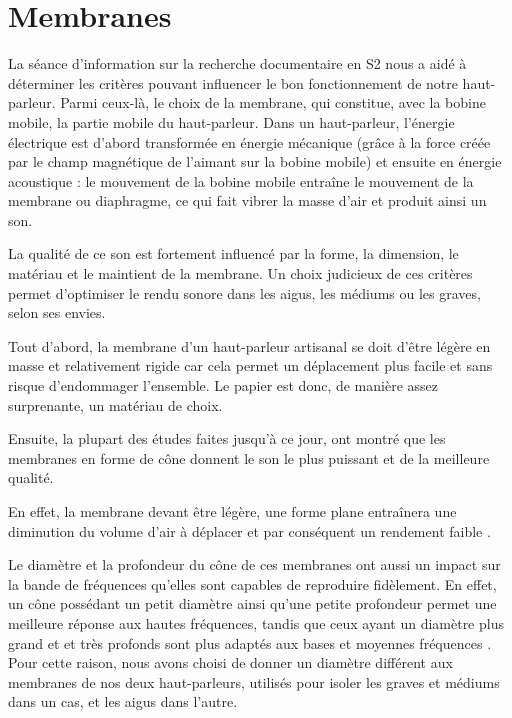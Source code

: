 \section{Membranes}

La séance d’information sur la recherche documentaire en S2
nous a aidé à déterminer les critères pouvant influencer
le bon fonctionnement de notre haut-parleur.
Parmi ceux-là, le choix de la membrane, qui constitue, avec la bobine mobile, la partie mobile
du haut-parleur. Dans un haut-parleur, l'énergie électrique est d'abord transformée en énergie mécanique (grâce à la force créée par le champ magnétique de l'aimant sur la bobine mobile) et ensuite en énergie acoustique : le mouvement de la bobine mobile entraîne le mouvement de la membrane ou diaphragme, ce qui fait vibrer la masse d'air et produit ainsi un son.

La qualité de ce son est fortement influencé par la forme, la dimension, le matériau et le maintient de la membrane.
Un choix judicieux de ces critères permet d'optimiser le rendu sonore dans les aigus, les médiums ou les graves, selon ses envies.

Tout d’abord, la membrane d’un haut-parleur artisanal
se doit d’être légère en masse et relativement rigide
car cela permet un déplacement plus facile et
sans risque d’endommager l’ensemble.
Le papier est donc, de manière assez surprenante, un matériau de choix.

Ensuite, la plupart des études faites jusqu’à ce jour,
ont montré que les membranes en forme de cône
donnent le son le plus puissant et de la meilleure qualité.

En effet, la membrane devant être légère, une forme plane entraînera une diminution du volume d’air à déplacer et par conséquent un rendement faible \cite{f1964compound}.

Le diamètre et la profondeur du cône de ces membranes
ont aussi un impact sur la bande de fréquences
qu’elles sont capables de reproduire fidèlement.
En effet, un cône possédant un petit diamètre ainsi qu'une petite profondeur
permet une meilleure réponse aux hautes fréquences,
tandis que ceux ayant un diamètre plus grand et et très profonds sont plus adaptés aux bases et moyennes fréquences \cite{Miller}.
Pour cette raison, nous avons choisi de donner un diamètre
différent aux membranes de nos deux haut-parleurs,
utilisés pour isoler les graves et médiums dans un cas,
et les aigus dans l'autre.

